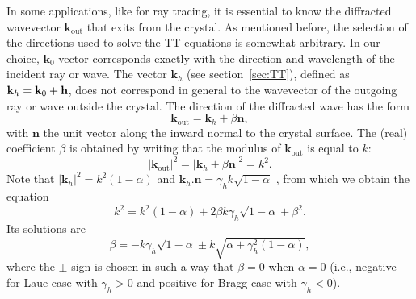 \documentclass[preprint]{iucr}              %
\begin{document}
In some applications, like for ray tracing, it is essential to know the diffracted wavevector $\textbf{k}_{\text{out}}$ that exits from the crystal. As mentioned before, the selection of the directions used to solve the TT equations is somewhat arbitrary. In our choice, $\textbf{k}_0$ vector corresponds exactly with the direction and wavelength of the incident ray or wave.
The vector $\textbf{k}_h$ (see section~\ref{sec:TT}), defined  as $\textbf k_h=\textbf k_0 + \textbf h$, does not correspond in general to the wavevector of the outgoing ray or wave outside the crystal. The direction of the diffracted wave has the form 
\begin{equation}
    \textbf{k}_{\text{out}} = \textbf{k}_h + \beta \textbf{n}, \nonumber
\end{equation}
with $\textbf{n}$ the unit vector along the inward normal to the crystal surface. The (real) coefficient $\beta$ is obtained by writing that the modulus of $\textbf{k}_{\text{out}}$ is equal to $k$:
\begin{equation}
    |\textbf{k}_{\text{out}}|^2 = |\textbf{k}_h + \beta \textbf{n}|^2=k^2. \nonumber
\end{equation}
Note that $|\textbf{k}_h|^2=k^2(1-\alpha)$ and $\textbf{k}_h . \textbf{n} = \gamma_h k \sqrt{1-\alpha}$ , from which we obtain the equation
\begin{equation}
    k^2 = k^2 (1-\alpha) + 
    2 \beta k \gamma_h \sqrt{1-\alpha}
    + \beta^2. \nonumber
\end{equation}
Its solutions are
\begin{equation}
    \beta = - k \gamma_h \sqrt{1-\alpha} \pm k \sqrt{\alpha + \gamma_h^2 (1-\alpha)}, \nonumber
\end{equation}
where the $\pm$ sign is chosen in such a way that $\beta=0$ when $\alpha=0$ (i.e., negative for Laue case with $\gamma_h>0$ and positive for Bragg case with $\gamma_h<0$).

\end{document}

